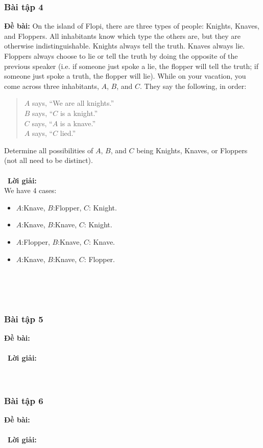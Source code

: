 \documentclass[a4paper]{article}
\begin{document}
\subsubsection{Bài tập 4}
\textbf{Đề bài:} On the island of Flopi, there are three types of people: Knights, Knaves, and Floppers. All inhabitants know which type the others are, but they are otherwise indistinguishable. Knights always tell the truth. Knaves always lie. Floppers always choose to lie or tell the truth by doing the opposite of the previous speaker (i.e. if someone just spoke a lie, the flopper will tell the truth; if someone just spoke a truth, the flopper will lie). While on your vacation, you come across three inhabitants, $A$, $B$, and $C$. They say the following, in order:
\begin{quote}
$A$ says, ``We are all knights.''\\
$B$ says, ``$C$ is a knight.''\\
$C$ says, ``$A$ is a knave.''\\
$A$ says, ``$C$ lied.''
\end{quote}
Determine all possibilities of $A$, $B$, and $C$ being Knights, Knaves, or Floppers (not all need to be distinct). 
\\\ \\\
\textbf{Lời giải:} \\We have 4 cases:
\begin{itemize}
\item $A$:Knave, $B$:Flopper, $C$: Knight.
\item $A$:Knave, $B$:Knave, $C$: Knight.
\item $A$:Flopper, $B$:Knave, $C$: Knave.
\item $A$:Knave, $B$:Knave, $C$: Flopper.
\end{itemize} \\\ \\\
\clearpage
\subsubsection{Bài tập 5}
\textbf{Đề bài:} 
\\\ \\\
\textbf{Lời giải:} \\\ \\\
\clearpage
\subsubsection{Bài tập 6}
\textbf{Đề bài:} 
\\\ \\\
\textbf{Lời giải:} \\\ \\\
\clearpage
\end{document}

